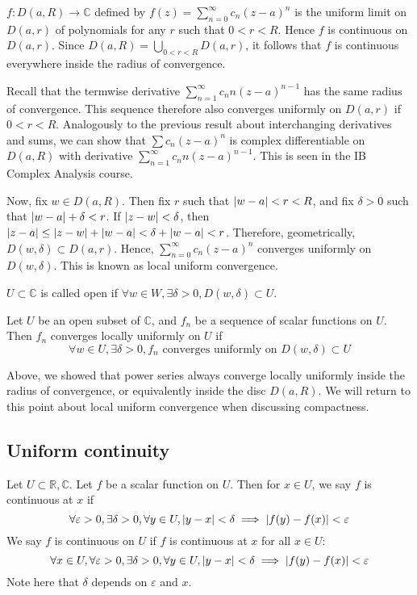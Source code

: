 \begin{remark}
	\( f \colon D(a,R) \to \mathbb C \) defined by \( f(z) = \sum_{n=0}^\infty c_n (z-a)^n \) is the uniform limit on \( D(a,r) \) of polynomials for any \( r \) such that \( 0 < r < R \).
	Hence \( f \) is continuous on \( D(a,r) \).
	Since \( D(a,R) = \bigcup_{0 < r < R} D(a,r) \), it follows that \( f \) is continuous everywhere inside the radius of convergence.

	Recall that the termwise derivative \( \sum_{n=1}^\infty c_n n(z-a)^{n-1} \) has the same radius of convergence.
	This sequence therefore also converges uniformly on \( D(a,r) \) if \( 0 < r < R \).
	Analogously to the previous result about interchanging derivatives and sums, we can show that \( \sum c_n (z-a)^n \) is complex differentiable on \( D(a,R) \) with derivative \( \sum_{n=1}^\infty c_n n(z-a)^{n-1} \).
	This is seen in the IB Complex Analysis course.

	Now, fix \( w \in D(a,R) \).
	Then fix \( r \) such that \( \abs{w-a} < r < R \), and fix \( \delta > 0 \) such that \( \abs{w-a} + \delta < r \).
	If \( \abs{z-w} < \delta \), then \( \abs{z-a} \leq \abs{z-w} + \abs{w-a} < \delta + \abs{w-a} < r \).
	Therefore, geometrically, \( D(w,\delta) \subset D(a,r) \).
	Hence, \( \sum_{n=0}^\infty c_n (z-a)^n \) converges uniformly on \( D(w,\delta) \).
	This is known as local uniform convergence.
\end{remark}
\begin{definition}
	\( U \subset \mathbb C \) is called open if \( \forall w \in W, \exists \delta > 0, D(w,\delta) \subset U \).
\end{definition}
\begin{definition}
	Let \( U \) be an open subset of \( \mathbb C \), and \( f_n \) be a sequence of scalar functions on \( U \).
	Then \( f_n \) converges locally uniformly on \( U \) if
	\[
		\forall w \in U, \exists \delta > 0, f_n \text{ converges uniformly on } D(w,\delta) \subset U
	\]
\end{definition}
\begin{remark}
	Above, we showed that power series always converge locally uniformly inside the radius of convergence, or equivalently inside the disc \( D(a,R) \).
	We will return to this point about local uniform convergence when discussing compactness.
\end{remark}

\subsection{Uniform continuity}
Let \( U \subset \mathbb R, \mathbb C \).
Let \( f \) be a scalar function on \( U \).
Then for \( x \in U \), we say \( f \) is continuous at \( x \) if
\[
	\forall \varepsilon > 0, \exists \delta > 0, \forall y \in U, \abs{y-x} < \delta \implies \abs{f(y)-f(x)} < \varepsilon
\]
We say \( f \) is continuous on \( U \) if \( f \) is continuous at \( x \) for all \( x \in U \):
\[
	\forall x \in U, \forall \varepsilon > 0, \exists \delta > 0, \forall y \in U, \abs{y-x} < \delta \implies \abs{f(y)-f(x)} < \varepsilon
\]
Note here that \( \delta \) depends on \( \varepsilon \) and \( x \).
